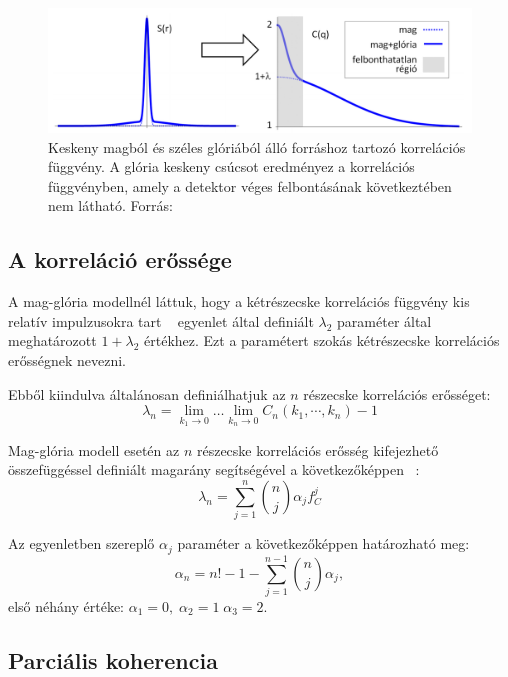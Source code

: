 \documentclass[10pt,a4paper]{article}
\numberwithin{equation}{subsection}
\numberwithin{figure}{section}
\begin{document}
\begin{figure}[H]
\centering
\includegraphics[scale=0.4]{pic/BEintro/CH2}
\caption{Keskeny magból és széles glóriából álló forráshoz tartozó korrelációs függvény. A glória keskeny csúcsot eredményez a korrelációs függvényben, amely a detektor véges felbontásának következtében nem látható. Forrás: ~\cite{CsanadHabil}}
\label{fig:ch2}
\end{figure}


\subsection{A korreláció erőssége}
A mag-glória modellnél láttuk, hogy a kétrészecske korrelációs függvény kis relatív impulzusokra tart ~ egyenlet által definiált $\lambda_2$ paraméter által meghatározott $1+\lambda_2$ értékhez. Ezt a paramétert szokás kétrészecske korrelációs erősségnek nevezni.

Ebből kiindulva általánosan definiálhatjuk az $n$ részecske korrelációs erősséget:
\begin{equation}
\lambda_n = \lim_{k_1\rightarrow 0}\dots\lim_{k_n\rightarrow 0}C_n(k_1,\cdots,k_n)-1
\label{eq:lambdan}
\end{equation}

Mag-glória modell esetén az $n$ részecske korrelációs erősség kifejezhető ~ összefüggéssel definiált magarány segítségével a következőképpen ~\cite{Csorgo:1997uf}:
\begin{equation}
\lambda_n =\sum_{j=1}^n\binom{n}{j}\alpha_j f_C^j
\label{eq:CHlambdan}
\end{equation}

Az egyenletben szereplő $\alpha_j$ paraméter a következőképpen határozható meg:
\begin{equation}
\alpha_n = n!-1-\sum_{j=1}^{n-1}\binom{n}{j}\alpha_j,
\label{eq:alphan}
\end{equation}
első néhány értéke: $\alpha_1=0,\;\alpha_2=1\;\alpha_3=2$.

\subsection{Parciális koherencia}
\end{document}
